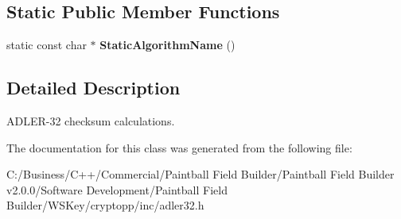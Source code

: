 \subsection*{Static Public Member Functions}
\begin{DoxyCompactItemize}
\item 
\hypertarget{class_adler32_a3bad9a279809dec27253b80169abbe15}{
static const char $\ast$ {\bfseries StaticAlgorithmName} ()}
\label{class_adler32_a3bad9a279809dec27253b80169abbe15}

\end{DoxyCompactItemize}


\subsection{Detailed Description}
ADLER-\/32 checksum calculations. 

The documentation for this class was generated from the following file:\begin{DoxyCompactItemize}
\item 
C:/Business/C++/Commercial/Paintball Field Builder/Paintball Field Builder v2.0.0/Software Development/Paintball Field Builder/WSKey/cryptopp/inc/adler32.h\end{DoxyCompactItemize}
